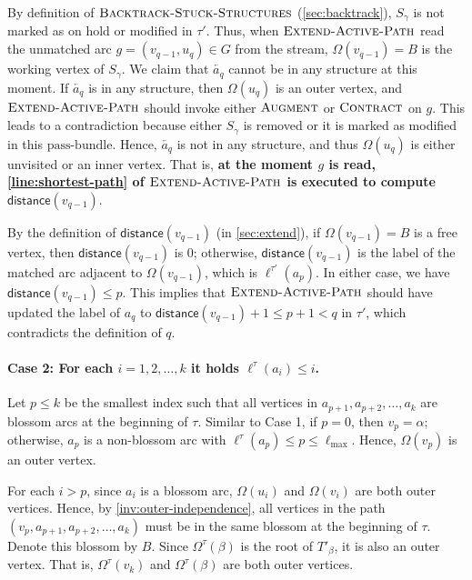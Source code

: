 \documentclass{article}
\newcommand{\alp}{\alpha}
\newcommand{\Omg}{\Omega}
\newcommand{\lmax}{\ell_{\max}}
\newcommand{\bundle}{\text{pass-bundle}\xspace}
\newcommand{\lab}{\mathsf{distance}}
\newcommand{\algExtend}{\textsc{Extend-Active-Path}\xspace}
\newcommand{\algBacktrack}{\textsc{Backtrack-Stuck-Structures}\xspace}
\newcommand{\algAugment}{\textsc{Augment}\xspace}
\newcommand{\algContract}{\textsc{Contract}\xspace}
\newcommand\cev[1]{\overleftarrow{#1}}
\begin{document}
    
    By definition of $\algBacktrack$ (\cref{sec:backtrack}), $S_\gamma$ is not marked as on hold or modified in $\tau'$.
    Thus, when $\algExtend$ read the unmatched arc $g = (v_{q-1}, u_q) \in G$ from the stream, $\Omg(v_{q-1}) = B$ is the working vertex of $S_\gamma$.
    We claim that $\cev{a_q}$ cannot be in any structure at this moment.
    If $\cev{a_q}$ is in any structure, then $\Omg(u_q)$ is an outer vertex, and $\algExtend$ should invoke either $\algAugment$ or $\algContract$ on $g$.
    This leads to a contradiction because either $S_\gamma$ is removed or it is marked as modified in this $\bundle$.
    Hence, $\cev{a_q}$ is not in any structure, and thus $\Omg(u_q)$ is either unvisited or an inner vertex.
    That is, \textbf{at the moment $g$ is read, \cref*{line:shortest-path} of $\algExtend$ is executed to compute $\lab(v_{q-1})$}.

    By the definition of $\lab(v_{q-1})$ (in \cref{sec:extend}), if $\Omg(v_{q-1}) = B$ is a free vertex, then $\lab(v_{q-1})$ is $0$;
    otherwise, $\lab(v_{q-1})$ is the label of the matched arc adjacent to $\Omg(v_{q-1})$, which is $\ell^{\tau'}(a_p)$.
    In either case, we have $\lab(v_{q-1}) \leq p$.
    This implies that $\algExtend$ should have updated the label of $a_q$ to $\lab(v_{q-1}) + 1 \leq p + 1 < q$ in $\tau'$, which contradicts the definition of $q$.





    \paragraph{Case 2: For each $i = 1, 2, \ldots, k$ it holds $\ell^{\tau}(a_i) \leq i$.}
    Let $p \leq k$ be the smallest index such that all vertices in $a_{p+1}, a_{p+2}, \dots, a_k$ are blossom arcs at the beginning of $\tau$. 
    Similar to Case 1, if $p = 0$, then $v_p = \alp$; otherwise, $a_p$ is a non-blossom arc with $\ell^{\tau}(a_p) \leq p \leq \lmax$. 
    Hence, $\Omg(v_p)$ is an outer vertex.

    For each $i > p$, since $a_i$ is a blossom arc, $\Omg(u_i)$ and $\Omg(v_i)$ are both outer vertices.
    Hence, by \cref{inv:outer-independence}, all vertices in the path $(v_p, a_{p+1}, a_{p+2}, \dots, a_{k})$ must be in the same blossom at the beginning of $\tau$.
    Denote this blossom by $B$.
    Since $\Omg^\tau(\beta)$ is the root of $T'_\beta$, it is also an outer vertex.
    That is, $\Omg^\tau(v_k)$ and $\Omg^\tau(\beta)$ are both outer vertices.
    
\end{document}
